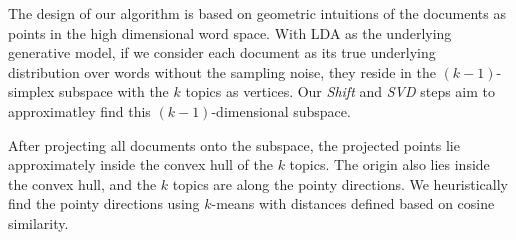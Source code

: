 The design of our algorithm is based on geometric intuitions of the documents
as points in the high dimensional word space. With LDA as the underlying generative model, if we consider each document as its true underlying distribution over words without the sampling noise, they reside in the $(k-1)$-simplex subspace with the $k$ topics as vertices. Our {\em Shift} and {\em SVD} steps aim to approximatley find this $(k-1)$-dimensional subspace.

After projecting all documents onto the subspace, the projected points lie approximately inside the convex hull of the $k$ topics. The origin also lies inside the convex hull, and the $k$ topics are along the pointy directions. We heuristically find the pointy directions using $k$-means with distances defined based on cosine similarity. 

